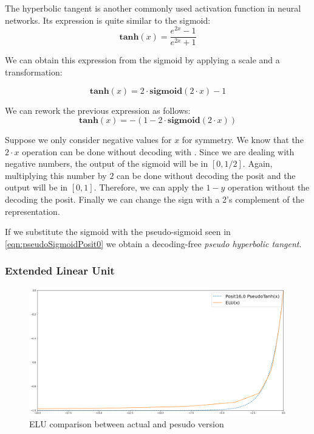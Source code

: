 The hyperbolic tangent is another commonly used activation function in neural networks. Its expression is quite similar to the sigmoid:
\begin{equation}
    \mathbf{tanh}(x) = \frac{e^{2x}-1}{e^{2x}+1} 
\end{equation}

We can obtain this expression from the sigmoid by applying a scale and a transformation:

\begin{equation}
   \mathbf{tanh}(x) =  2 \cdot \mathbf{sigmoid}(2 \cdot x) - 1
\end{equation}

We can rework the previous expression as follows:
\begin{equation}
    \mathbf{tanh}(x) = - ( 1 - 2\cdot \mathbf{sigmoid}(2\cdot x))
\end{equation}

Suppose we only consider negative values for $x$ for symmetry. We know that the $2\cdot x$ operation can be done without decoding with . Since we are dealing with negative numbers, the output of the sigmoid will be in $[0,1/2]$. Again, multiplying this number by $2$ can be done without decoding the posit and the output will be in $[0,1]$. Therefore, we can apply the $1-y$ operation without the decoding the posit. Finally we can change the sign with a 2's complement of the representation.

If we substitute the sigmoid with the pseudo-sigmoid seen in \eqref{eqn:pseudoSigmoidPosit0} we obtain a decoding-free \textit{pseudo hyperbolic tangent}.

\subsubsection{Extended Linear Unit}

\begin{figure}
    \centering
    \includegraphics[width=\linewidth]{img/eluPosit160.png}
    \caption{ELU comparison between actual and pesudo version}
    \label{fig:pseudoEluPosit0}
\end{figure}


